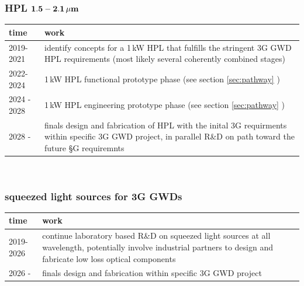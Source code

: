 \subsubsection{{HPL ${\bf 1.5 - 2.1 \, {\bf \mu m}}$}}
\begin{tabular}{|p{1.8 cm}|p{10cm}|}
	\hline 
	\textbf{time} & \textbf{work}  \\ 
	\hline 
	2019-2021 &identify concepts for a 1\,kW HPL that fulfills the stringent 3G GWD HPL requirements (most likely several coherently combined stages)\\ 
	\hline 
	2022-2024 & 1\,kW HPL functional prototype phase (see section \ref{sec:pathway} ) \\ 
	\hline 
	2024 - 2028 & 1\,kW HPL engineering prototype phase (see section \ref{sec:pathway} ) \\ 
	\hline 
	2028 - & finals design and fabrication of HPL with the inital 3G requirments within specific 3G GWD project, in parallel R\&D on path toward the future §G requiremnts \\
	\hline
\end{tabular} \\

\subsubsection{squeezed light sources for 3G GWDs}
\begin{tabular}{|p{1.8 cm}|p{10cm}|}
	\hline 
	\textbf{time} & \textbf{work}  \\ 
	\hline 
	2019-2026 &continue laboratory based R\&D on squeezed light sources at all wavelength, potentially involve industrial partners to design and fabricate low loss optical components\\ 
	\hline 
	2026 - & finals design and fabrication within specific 3G GWD project \\
	\hline
\end{tabular} \\


